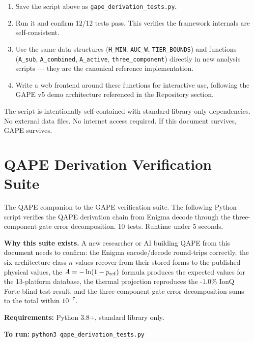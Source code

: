 \documentclass[12pt,a4paper]{article}
\begin{document}
\begin{enumerate}
\item Save the script above as \texttt{gape\_derivation\_tests.py}.
\item Run it and confirm 12/12 tests pass. This verifies the framework
  internals are self-consistent.
\item Use the same data structures (\texttt{H\_MIN}, \texttt{AUC\_W},
  \texttt{TIER\_BOUNDS}) and functions (\texttt{A\_sub}, \texttt{A\_combined},
  \texttt{A\_active}, \texttt{three\_component}) directly in new analysis
  scripts --- they are the canonical reference implementation.
\item Write a web frontend around these functions for interactive use,
  following the GAPE v5 demo architecture referenced in the Repository
  section.
\end{enumerate}

The script is intentionally self-contained with standard-library-only
dependencies. No external data files. No internet access required. If this
document survives, GAPE survives.

\newpage
\section{QAPE Derivation Verification Suite}
\label{app:qape_tests}

The QAPE companion to the GAPE verification suite. The following Python script
verifies the QAPE derivation chain from Enigma decode through the three-
component gate error decomposition. 10 tests. Runtime under 5 seconds.

\textbf{Why this suite exists.} A new researcher or AI building QAPE from
this document needs to confirm: the Enigma encode/decode round-trips
correctly, the six architecture class $n$ values recover from their stored
forms to the published physical values, the $A = -\ln(1-p_{\rm ref})$
formula produces the expected values for the 13-platform database, the
thermal projection reproduces the -1.0\% IonQ Forte blind test result, and
the three-component gate error decomposition sums to the total within
$10^{-7}$.

\textbf{Requirements:} Python 3.8+, standard library only.

\textbf{To run:} \texttt{python3 qape\_derivation\_tests.py}
\end{document}
